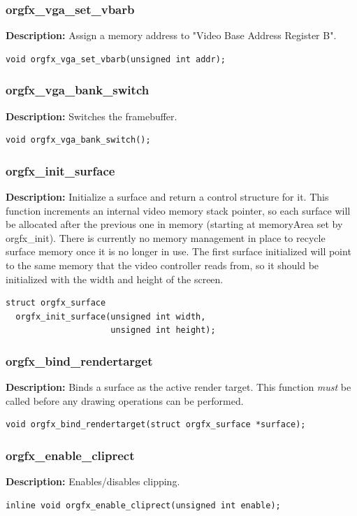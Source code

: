 \documentclass[10pt,a4paper]{article}
\begin{document}
\subsubsection{orgfx\_vga\_set\_vbarb}
\textbf{Description:} Assign a memory address to "Video Base Address Register B".
\begin{lstlisting}
void orgfx_vga_set_vbarb(unsigned int addr);
\end{lstlisting}

\subsubsection{orgfx\_vga\_bank\_switch}
\textbf{Description:} Switches the framebuffer.
\begin{lstlisting}
void orgfx_vga_bank_switch();
\end{lstlisting}

\subsubsection{orgfx\_init\_surface}
\textbf{Description:} Initialize a surface and return a control structure for it. This function increments an internal video memory stack pointer, so each surface will be allocated after the previous one in memory (starting at memoryArea set by orgfx\_init). There is currently no memory management in place to recycle surface memory once it is no longer in use. The first surface initialized will point to the same memory that the video controller reads from, so it should be initialized with the width and height of the screen.
\begin{lstlisting}
struct orgfx_surface
  orgfx_init_surface(unsigned int width,
                     unsigned int height);
\end{lstlisting}

\subsubsection{orgfx\_bind\_rendertarget}
\textbf{Description:} Binds a surface as the active render target. This function \textit{must} be called before any drawing operations can be performed.
\begin{lstlisting}
void orgfx_bind_rendertarget(struct orgfx_surface *surface);
\end{lstlisting}

\subsubsection{orgfx\_enable\_cliprect}
\textbf{Description:} Enables/disables clipping.
\begin{lstlisting}
inline void orgfx_enable_cliprect(unsigned int enable);
\end{lstlisting}
\end{document}
